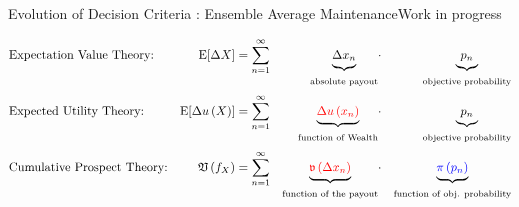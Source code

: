 \begin{frame}
{Evolution of Decision Criteria : Ensemble Average Maintenance}{Work in progress}

\begin{align*} \elabel{EvoDTs}
	&	\text{Expectation Value Theory:} &\EV{\D X}	&= \sum_{n=1}^{\infty}
	&	\underbrace{\Dx_n\strut}_{\text{absolute payout}\strut} &\cdot
	&	\underbrace{p_n\strut}_{\text{objective probability}\strut}\\
	\elabel{EvoDTs2}
	&	\text{Expected Utility Theory:} &\EV{\Du\left(X\right)}	&= \sum_{n=1}^{\infty}
	&	\underbrace{\red{\D u\left(x_n\right)}\strut}_{\text{function of Wealth}\strut} 	&	\cdot
	&	\underbrace{p_n\strut}_{\text{objective probability}\strut}  \\
	\elabel{EvoDTs3}
	&	\text{Cumulative Prospect Theory:} &\mathfrak{V}\left( f_X \right)
	&=	\sum_{n=1}^{\infty} & \underbrace{\red{\mathfrak{v}\left(\Dx_n\right)}\strut}_{\text{function of the payout}\strut} &	\cdot &	\underbrace{\blue{\pi\left(p_n\right)}\strut}_{\text{function of obj. probability}\strut}
\end{align*}



\label{EvolutionDT}

% 

\end{frame}


